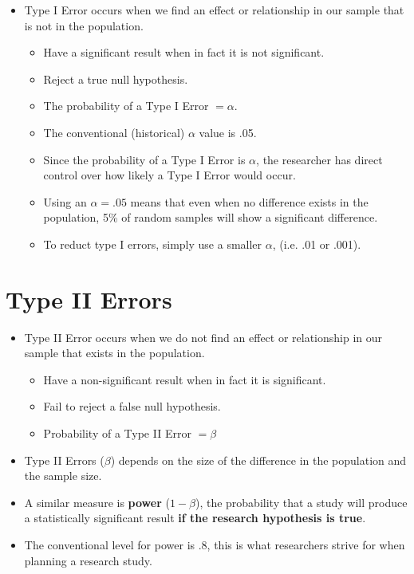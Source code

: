 \documentclass[12pt]{article}
\begin{document}
\begin{itemize}
\itemsep1pt\parskip0pt
\item
  Type I Error occurs when we find an effect or relationship in our
  sample that is not in the population.

  \begin{itemize}
  \itemsep1pt\parskip0pt
  \item
    Have a significant result when in fact it is not significant.
  \item
    Reject a true null hypothesis.
  \item
    The probability of a Type I Error \(= \alpha\).
  \item
    The conventional (historical) \(\alpha\) value is .05.
  \item
    Since the probability of a Type I Error is \(\alpha\), the
    researcher has direct control over how likely a Type I Error would
    occur.
  \item
    Using an \(\alpha = .05\) means that even when no difference exists
    in the population, 5\% of random samples will show a significant
    difference.
  \item
    To reduct type I errors, simply use a smaller \(\alpha\), (i.e. .01
    or .001).
  \end{itemize}
\end{itemize}

\section{Type II Errors}\label{type-ii-errors}

\begin{itemize}
\itemsep1pt\parskip0pt
\item
  Type II Error occurs when we do not find an effect or relationship in
  our sample that exists in the population.

  \begin{itemize}
  \itemsep1pt\parskip0pt
  \item
    Have a non-significant result when in fact it is significant.
  \item
    Fail to reject a false null hypothesis.
  \item
    Probability of a Type II Error \(= \beta\)
  \end{itemize}
\item
  Type II Errors (\(\beta\)) depends on the size of the difference in
  the population and the sample size.
\item
  A similar measure is \textbf{power} (\(1-\beta\)), the probability
  that a study will produce a statistically significant result
  \textbf{if the research hypothesis is true}.
\item
  The conventional level for power is .8, this is what researchers
  strive for when planning a research study.
\end{itemize}
\end{document}

